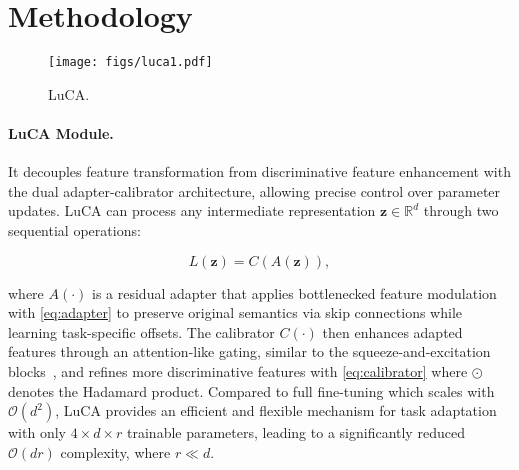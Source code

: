 
\section{Methodology}  
\label{sec:method}

\begin{wrapfigure}[17]{l}{0.2\textwidth}
\centering
  \vspace{-17pt}
  \texttt{[image: figs/luca1.pdf]}
  \caption{LuCA.}
  \label{fig:luca}
\end{wrapfigure}



\paragraph{LuCA Module.} It decouples feature transformation from discriminative feature enhancement with the dual adapter-calibrator architecture, allowing precise control over parameter updates. LuCA can process any intermediate representation $\mathbf{z} \in \mathbb{R}^d$ through two sequential operations:

\begin{equation}
    L(\mathbf{z}) = C(A(\mathbf{z})),
    \label{eq:general-bender}
\end{equation}


where $A(\cdot)$ is a residual adapter that applies bottlenecked feature modulation with \cref{eq:adapter} to preserve original semantics via skip connections while learning task-specific offsets. 
The calibrator $C(\cdot)$ then enhances adapted features through an attention-like gating, similar to the squeeze-and-excitation blocks~\cite{se_block}, and refines more discriminative features with \cref{eq:calibrator} where $\odot$ denotes the Hadamard product. Compared to full fine-tuning which scales with $\mathcal{O}(d^2)$, LuCA provides an efficient and flexible mechanism for task adaptation with only $4 \times d \times r$ trainable parameters, leading to a significantly reduced $\mathcal{O}(dr)$ complexity, where $r \ll d$.

